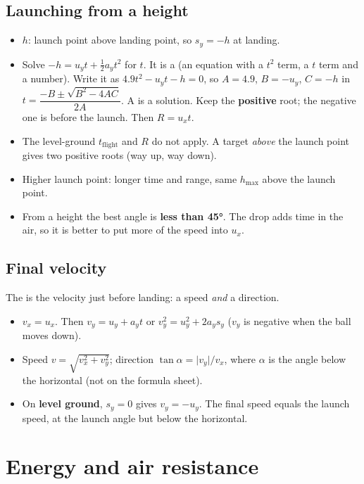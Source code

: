 \subsection{Launching from a height}
\begin{itemize}
  \item {} $h$: launch point above landing point, so $s_y = -h$ at landing.
  \item Solve $-h = u_y t + \frac{1}{2}a_y t^2$ for $t$. It is a 
        (an equation with a $t^2$ term, a $t$ term and a number). Write it as
        $4.9t^2 - u_y t - h = 0$, so $A = 4.9$, $B = -u_y$, $C = -h$ in
        $t = \dfrac{-B \pm \sqrt{B^2 - 4AC}}{2A}$. A  is a solution. Keep the
        \textbf{positive} root; the negative one is before the launch. Then $R = u_x t$.
  \item The level-ground $t_\mathrm{flight}$ and $R$ do not apply. A target \emph{above} the
        launch point gives two positive roots (way up, way down).
  \item Higher launch point: longer time and range, same $h_\mathrm{max}$ above the launch point.
  \item From a height the best angle is \textbf{less than \ang{45}}. The drop adds time in the
        air, so it is better to put more of the speed into $u_x$.
\end{itemize}

\subsection{Final velocity}
The  is the velocity just before landing: a speed \emph{and} a direction.
\begin{itemize}
  \item $v_x = u_x$. Then $v_y = u_y + a_y t$ or $v_y^2 = u_y^2 + 2a_y s_y$ ($v_y$ is negative
        when the ball moves down).
  \item Speed $v = \sqrt{v_x^2 + v_y^2}$; direction $\tan\alpha = \lvert v_y\rvert/v_x$, where
        $\alpha$ is the angle below the horizontal (not on the formula sheet).
  \item On \textbf{level ground}, $s_y = 0$ gives $v_y = -u_y$. The final speed equals the launch
        speed, at the launch angle but below the horizontal.
\end{itemize}

\section{Energy and air resistance}\label{ch1:sec:energy}

